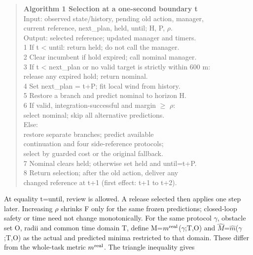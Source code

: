 \documentclass[conference]{IEEEtran}
\begin{document}
\begin{quote}\noindent\textbf{Algorithm 1  Selection at a one-second boundary t}\\[2pt]


Input: observed state/history, pending old action, manager, \\
       current reference, next\_plan, held, until; H, P, \ensuremath{\rho}. \\
Output: selected reference; updated manager and timers. \\
1  If t < until: return held; do not call the manager. \\
2  Clear incumbent if hold expired; call nominal manager. \\
3  If t < next\_plan or no valid target is strictly within 600 m: \\
       release any expired hold; return nominal. \\
4  Set next\_plan = t+P; fit local wind from history. \\
5  Restore a branch and predict nominal to horizon H. \\
6  If valid, integration-successful and margin \ensuremath{\ge} \ensuremath{\rho}: \\
       select nominal; skip all alternative predictions. \\
   Else: \\
       restore separate branches; predict available \\
       continuation and four side-reference protocols; \\
       select by guarded cost or the original fallback. \\
7  Nominal clears held; otherwise set held and until=t+P. \\
8  Return selection; after the old action, deliver any \\
   changed reference at t+1 (first effect: t+1 to t+2).
\end{quote}

At equality t=until, review is allowed. A release selected then applies one step later. Increasing \ensuremath{\rho} shrinks F only for the same frozen predictions; closed-loop safety or time need not change monotonically. For the same protocol \ensuremath{\gamma}, obstacle set O, radii and common time domain T, define M=$m^{\rm real}$(\ensuremath{\gamma};T,O) and $\widehat M$=$\hat m$(\ensuremath{\gamma};T,O) as the actual and predicted minima restricted to that domain. These differ from the whole-task metric $m^{\rm real}$. The triangle inequality gives
\end{document}
